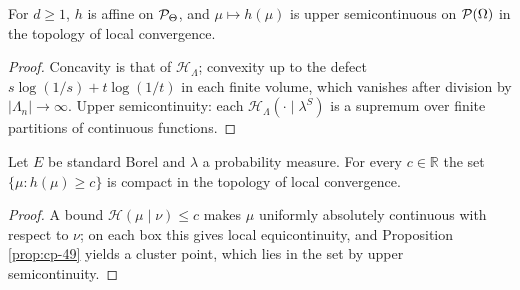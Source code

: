 \begin{proposition}[Georgii (15.14)(a),(b)]
    \label{prop:sent-15-14}
    \leanok

    For $d \geq 1$, $h$ is affine on $\mathcal{P}_\Theta$, and $\mu \mapsto h(\mu)$ is upper
    semicontinuous on $\mathcal{P}(\Omega)$ in the topology of local convergence.
\end{proposition}
\begin{proof}
    \leanok
    Concavity is that of $\mathcal H_\Lambda$; convexity up to the defect
    $s\log(1/s) + t\log(1/t)$ in each finite volume, which vanishes after division by
    $|\Lambda_n| \to \infty$. Upper semicontinuity: each $\mathcal H_\Lambda(\cdot \mid \lambda^S)$
    is a supremum over finite partitions of continuous functions.
\end{proof}

\begin{proposition}[Georgii (15.14)(c)]
    \label{prop:sent-15-14c}
    \leanok

    Let $E$ be standard Borel and $\lambda$ a probability measure. For every $c \in \mathbb R$
    the set $\{\mu : h(\mu) \geq c\}$ is compact in the topology of local convergence.
\end{proposition}
\begin{proof}
    \leanok
    A bound $\mathcal H(\mu \mid \nu) \leq c$ makes $\mu$ uniformly absolutely continuous with
    respect to $\nu$; on each box this gives local equicontinuity, and Proposition
    \ref{prop:cp-49} yields a cluster point, which lies in the set by upper semicontinuity.
\end{proof}

